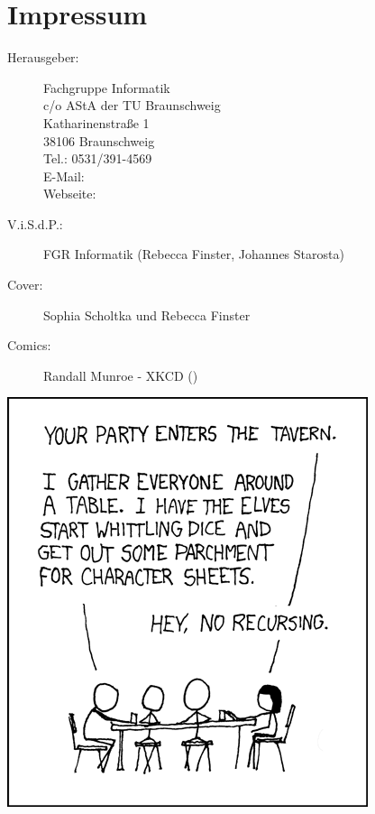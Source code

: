 \section{Impressum}
\label{impressum}
\begin{description}
\item[Herausgeber:]
	Fachgruppe Informatik\\
	c/o AStA der TU Braunschweig\\
	Katharinenstraße 1\\
	38106 Braunschweig\\
	Tel.: 0531/391-4569\\
	E-Mail: \\
	Webseite: \fginfoUrl
\item[V.i.S.d.P.:]  %
  FGR Informatik (Rebecca Finster, Johannes Starosta)
\item[Cover:] Sophia Scholtka und Rebecca Finster
\item[Comics:] Randall Munroe - XKCD ()
\end{description}
\begin{center}
		\includegraphics[totalheight=10cm]{bilder/XKCD/tabletop_roleplaying}
\end{center}